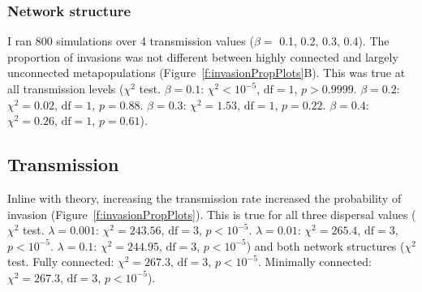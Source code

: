\subsubsection{Network structure}

I ran 800 simulations over 4 transmission values ($\beta = $ 0.1, 0.2, 0.3, 0.4).
The proportion of invasions was not different between highly connected and largely unconnected metapopulations (Figure~\ref{f:invasionPropPlots}B). 
This was true at all transmission levels ($\chi^2$ test. $\beta = 0.1$: $\chi^2 < 10^{-5}$, $\text{df} = 1$, $p > 0.9999$. $\beta = 0.2$: $\chi^2 = 0.02$, $\text{df} = 1$, $p = 0.88$. $\beta = 0.3$: $\chi^2 = 1.53$, $\text{df} = 1$, $p = 0.22$. $\beta = 0.4$: $\chi^2 = 0.26$, $\text{df} = 1$, $p = 0.61$).

 
\subsection{Transmission}

Inline with theory, increasing the transmission rate increased the probability of invasion (Figure~\ref{f:invasionPropPlots}).
This is true for all three dispersal values ($\chi^2$ test. $\lambda = 0.001$: $\chi^2 = 243.56$, $\text{df} = 3$, $p < 10^{-5}$. $\lambda = 0.01$: $\chi^2 = 265.4$, $\text{df} = 3$, $p < 10^{-5}$. $\lambda = 0.1$: $\chi^2 = 244.95$, $\text{df} = 3$, $p < 10^{-5}$) and both network structures ($\chi^2$ test. Fully connected: $\chi^2 = 267.3$, $\text{df} = 3$, $p < 10^{-5}$. Minimally connected: $\chi^2 =  267.3$, $\text{df} = 3$, $p < 10^{-5}$).









